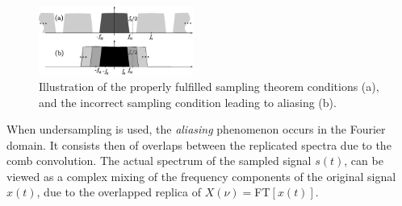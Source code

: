 %
\begin{figure}
  \centering
  \includegraphics[width=0.45\textwidth]{sampling_th.eps}
  \hspace{0.5cm}
  \caption{Illustration of the properly fulfilled sampling theorem
    conditions (a), and the incorrect sampling condition leading to
    aliasing (b).}
  \label{sampling_th}
\end{figure}
%
When undersampling is used, the {\em aliasing} phenomenon occurs in the Fourier domain. It consists then of overlaps between the replicated spectra due to the comb convolution. The actual spectrum of the sampled signal $s(t)$, can be viewed as a complex mixing of the frequency components of the original signal $x(t)$, due to the overlapped replica of $X(\nu)=$FT$[x(t)]$.
%
